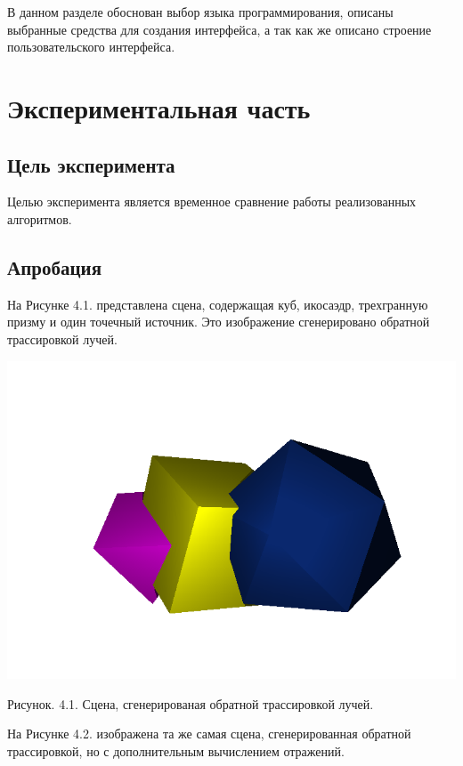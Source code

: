 \documentclass[12pt]{report}
\begin{document}
	В данном разделе обоснован выбор языка программирования, описаны выбранные средства для создания интерфейса, а так как же описано строение пользовательского интерфейса.


	\chapter{Экспериментальная часть}
	
	\section{Цель эксперимента}
	
	Целью эксперимента является временное сравнение работы реализованных алгоритмов.
	
	\section{Апробация}
	
	На Рисунке 4.1. представлена сцена, содержащая куб, икосаэдр, трехгранную призму и один точечный источник. Это изображение сгенерировано обратной трассировкой лучей.
	
	\begin{center}
		\includegraphics[scale=0.8]{rt.png}
		
		Рисунок. 4.1. Сцена, сгенерированая обратной трассировкой лучей.
	\end{center}

	На Рисунке 4.2. изображена та же самая сцена, сгенерированная обратной трассировкой, но с дополнительным вычислением отражений.
	
\end{document}
